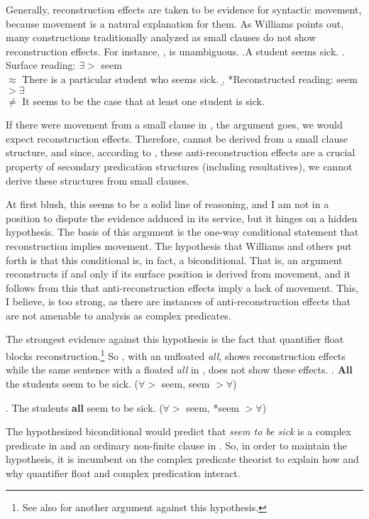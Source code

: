\documentclass[MilwayThesis]{subfiles}
\begin{document}
Generally, reconstruction effects are taken to be evidence for syntactic movement, because movement is a natural explanation for them.
As Williams points out, many constructions traditionally analyzed as small clauses do not show reconstruction effects.
For instance, \Next, is unambiguous.
\ex.A student seems sick.
\a. Surface reading: $\exists >$ seem\\
$\approx$ There is a particular student who seems sick.
\b. *Reconstructed reading: seem $> \exists$\\
$\neq$ It seems to be the case that at least one student is sick.

If there were movement from a small clause in \Last, the argument goes, we would expect reconstruction effects.
Therefore, \Last cannot be derived from a small clause structure, and since, according to \textcite{irimia2012secondary}, these anti-reconstruction effects are a crucial property of secondary predication structures (including resultatives), we cannot derive these structures from small clauses.

At first blush, this seems to be a solid line of reasoning, and I am not in a position to dispute the evidence adduced in its service, but it hinges on a hidden hypothesis.
The basis of this argument is the one-way conditional statement that reconstruction implies movement.
The hypothesis that Williams and others put forth is that this conditional is, in fact, a biconditional.
That is, an argument reconstructs if and only if its surface position is derived from movement, and it follows from this that anti-reconstruction effects imply a lack of movement.
This, I believe, is too strong, as there are instances of anti-reconstruction effects that are not amenable to analysis as complex predicates.

The strongest evidence against this hypothesis is the fact that quantifier float blocks reconstruction.\footnote{See also \textcite{bobaljik2004anti} for another argument against this hypothesis.}
So \Next, with an unfloated \textit{all}, shows reconstruction effects while the same sentence with a floated \textit{all} in \NNext, does not show these effects.
\ex. \textbf{All} the students seem to be sick. ($\forall >$ seem, seem $> \forall$)

\ex. The students \textbf{all} seem to be sick. ($\forall >$ seem, *seem $> \forall$)

The hypothesized biconditional would predict that \textit{seem to be sick} is a complex predicate in \Last and an ordinary non-finite clause in \LLast.
So, in order to maintain the hypothesis, it is incumbent on the complex predicate theorist to explain how and why quantifier float and complex predication interact.
\end{document}

